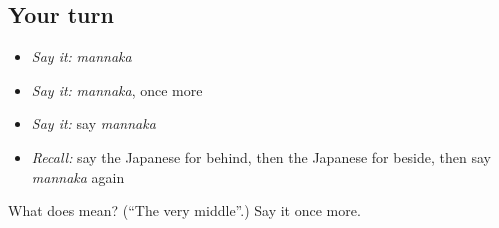 \subsection*{Your turn}
\begin{itemize}
\raggedright
  \item \emph{Say it:} \emph{mannaka}
  \item \emph{Say it:} \emph{mannaka}, once more
  \item \emph{Say it:} say \emph{mannaka}
  \item \emph{Recall:} say the Japanese for behind, then the Japanese for beside, then say \emph{mannaka} again
\end{itemize}

\begin{tcolorbox}[breakable,colback=teal!4,colframe=teal!35!black,title={Before you move on}]
What does  mean? (\textquotedblleft{}The very middle\textquotedblright{}.) Say it once more.
\end{tcolorbox}
